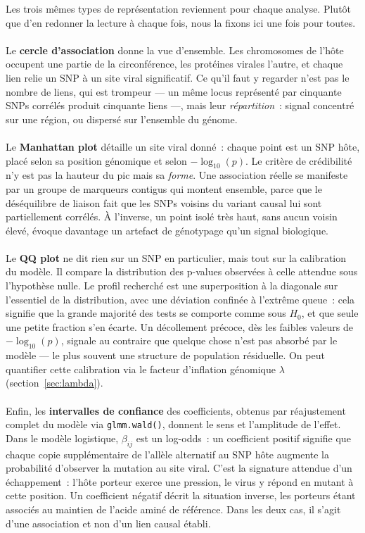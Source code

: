 \documentclass[11pt,a4paper]{article}
\begin{document}
Les trois mêmes types de représentation reviennent pour chaque analyse. Plutôt que d'en
redonner la lecture à chaque fois, nous la fixons ici une fois pour toutes.
\\
\\
Le \textbf{cercle d'association} donne la vue d'ensemble. Les chromosomes de l'hôte occupent une
partie de la circonférence, les protéines virales l'autre, et chaque lien relie un SNP à un site
viral significatif. Ce qu'il faut y regarder n'est pas le nombre de liens, qui est trompeur — un
même locus représenté par cinquante SNPs corrélés produit cinquante liens —, mais leur
\emph{répartition}~: signal concentré sur une région, ou dispersé sur l'ensemble du génome.
\\
\\
Le \textbf{Manhattan plot} détaille un site viral donné~: chaque point est un SNP hôte, placé selon
sa position génomique et selon $-\log_{10}(p)$. Le critère de crédibilité n'y est pas la hauteur du
pic mais sa \emph{forme}. Une association réelle se manifeste par un groupe de marqueurs contigus
qui montent ensemble, parce que le déséquilibre de liaison fait que les SNPs voisins du variant
causal lui sont partiellement corrélés. À l'inverse, un point isolé très haut, sans aucun voisin
élevé, évoque davantage un artefact de génotypage qu'un signal biologique.
\\
\\
Le \textbf{QQ plot} ne dit rien sur un SNP en particulier, mais tout sur la calibration du modèle.
Il compare la distribution des p-values observées à celle attendue sous l'hypothèse nulle. Le
profil recherché est une superposition à la diagonale sur l'essentiel de la distribution, avec une
déviation confinée à l'extrême queue~: cela signifie que la grande majorité des tests se comporte
comme sous $H_0$, et que seule une petite fraction s'en écarte. Un décollement précoce, dès les
faibles valeurs de $-\log_{10}(p)$, signale au contraire que quelque chose n'est pas absorbé par le
modèle — le plus souvent une structure de population résiduelle. On peut quantifier cette calibration
via le facteur d'inflation génomique $\lambda$ (section~\ref{sec:lambda}).
\\
\\ 
Enfin, les \textbf{intervalles de confiance} des coefficients, obtenus par réajustement complet du
modèle via \texttt{glmm.wald()}, donnent le sens et l'amplitude de l'effet. Dans le modèle
logistique, $\beta_{ij}$ est un log-odds~: un coefficient positif signifie que chaque copie
supplémentaire de l'allèle alternatif au SNP hôte augmente la probabilité d'observer la mutation
au site viral. C'est la signature attendue d'un échappement~: l'hôte porteur exerce une pression,
le virus y répond en mutant à cette position. Un coefficient négatif décrit la situation inverse,
les porteurs étant associés au maintien de l'acide aminé de référence. Dans les deux cas, il
s'agit d'une association et non d'un lien causal établi.
 
\end{document}
